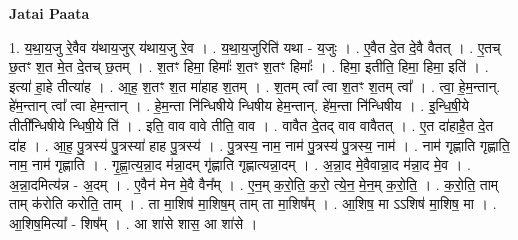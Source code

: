 \documentclass[17pt]{extarticle}
\begin{document}
\textbf{Jatai Paata} \newline

1. य॒था॒य॒जु रे॒वैव य॑थाय॒जुर् य॑थाय॒जु रे॒व । . य॒था॒य॒जुरिति॑ यथा - य॒जुः । . ए॒वैत दे॒त दे॒वै वैतत् । . ए॒तच् छ॒तꣳ श॒त मे॒त दे॒तच् छ॒तम् । . श॒तꣳ हिमा॒ हिमाः᳚ श॒तꣳ श॒तꣳ हिमाः᳚ । . हिमा॒ इतीति॒ हिमा॒ हिमा॒ इति॑ । . इत्या॑ हा॒हे तीत्या॑ह । . आ॒ह॒ श॒तꣳ श॒त मा॑हाह श॒तम् । . श॒तम् त्वा᳚ त्वा श॒तꣳ श॒तम् त्वा᳚ । . त्वा॒ हे॒म॒न्तान्. हे॑म॒न्तान् त्वा᳚ त्वा हेम॒न्तान् । . हे॒म॒न्ता नि॑न्धिषीये न्धिषीय हेम॒न्तान्. हे॑म॒न्ता नि॑न्धिषीय । . इ॒न्धि॒षी॒ये तीती᳚न्धिषीये न्धिषी॒ये ति॑ । . इति॒ वाव वावे तीति॒ वाव । . वावैत दे॒तद् वाव वावैतत् । . ए॒त दा॑हाहै॒त दे॒त दा॑ह । . आ॒ह॒ पु॒त्रस्य॑ पु॒त्रस्या॑ हाह पु॒त्रस्य॑ । . पु॒त्रस्य॒ नाम॒ नाम॑ पु॒त्रस्य॑ पु॒त्रस्य॒ नाम॑ । . नाम॑ गृह्णाति गृह्णाति॒ नाम॒ नाम॑ गृह्णाति । . गृ॒ह्णा॒त्य॒न्ना॒द म॑न्ना॒दम् गृ॑ह्णाति गृह्णात्यन्ना॒दम् । . अ॒न्ना॒द मे॒वैवान्ना॒द म॑न्ना॒द मे॒व । . अ॒न्ना॒दमित्य॑न्न - अ॒दम् । . ए॒वैन॑ मेन मे॒वै वैन᳚म् । . ए॒न॒म् क॒रो॒ति॒ क॒रो॒ त्ये॒न॒ मे॒न॒म् क॒रो॒ति॒ । . क॒रो॒ति॒ ताम् ताम् क॑रोति करोति॒ ताम् । . ता मा॒शिष॑ मा॒शिष॒म् ताम् ता मा॒शिष᳚म् । . आ॒शिष॒ मा ऽऽशिष॑ मा॒शिष॒ मा । . आ॒शिष॒मित्या᳚ - शिष᳚म् । . आ शा॑से शास॒ आ शा॑से । \newline
\end{document}
